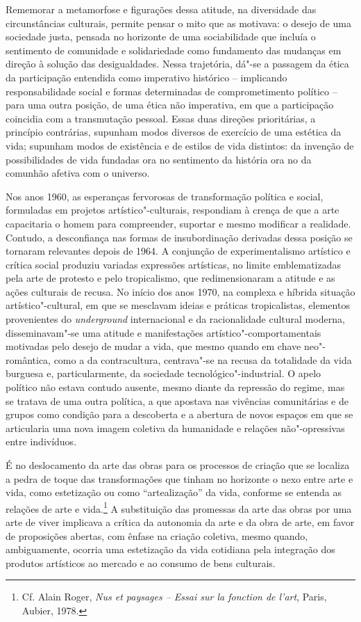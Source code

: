 Rememorar a metamorfose e figurações dessa atitude, na diversidade das
circunstâncias culturais, permite pensar o mito que as motivava: o
desejo de uma sociedade justa, pensada no horizonte de uma sociabilidade
que incluía o sentimento de comunidade e solidariedade como fundamento
das mudanças em direção à solução das desigualdades. Nessa trajetória,
dá"-se a passagem da ética da participação entendida como imperativo
histórico -- implicando responsabilidade social e formas determinadas de
comprometimento político -- para uma outra posição, de uma ética não
imperativa, em que a participação coincidia com a transmutação pessoal.
Essas duas direções prioritárias, a princípio contrárias, supunham modos
diversos de exercício de uma estética da vida; supunham modos de
existência e de estilos de vida distintos: da invenção de possibilidades
de vida fundadas ora no sentimento da história ora no da comunhão
afetiva com o universo.

Nos anos 1960, as esperanças fervorosas de transformação política e
social, formuladas em projetos artístico"-culturais, respondiam à crença
de que a arte capacitaria o homem para compreender, suportar e mesmo
modificar a realidade. Contudo, a desconfiança nas formas de
insubordinação derivadas dessa posição se tornaram relevantes depois de
1964. A conjunção de experimentalismo artístico e crítica social
produziu variadas expressões artísticas, no limite emblematizadas pela
arte de protesto e pelo tropicalismo, que redimensionaram a atitude e as
ações culturais de recusa. No início dos anos 1970, na complexa e
híbrida situação artístico"-cultural, em que se mesclavam ideias e
práticas tropicalistas, elementos provenientes do \emph{underground}
internacional e da racionalidade cultural moderna, disseminavam"-se uma
atitude e manifestações artístico"-comportamentais motivadas pelo desejo
de mudar a vida, que mesmo quando em chave neo"-romântica, como a da
contracultura, centrava"-se na recusa da totalidade da vida burguesa e,
particularmente, da sociedade tecnológico"-industrial. O apelo político
não estava contudo ausente, mesmo diante da repressão do regime, mas se
tratava de uma outra política, a que apostava nas vivências comunitárias
e de grupos como condição para a descoberta e a abertura de novos
espaços em que se articularia uma nova imagem coletiva da humanidade e
relações não"-opressivas entre indivíduos.

É no deslocamento da arte das obras para os processos de criação que se
localiza a pedra de toque das transformações que tinham no horizonte o
nexo entre arte e vida, como estetização ou como ``artealização'' da
vida, conforme se entenda as relações de arte e vida.\footnote{Cf. Alain Roger, \emph{Nus et paysages -- Essai sur la fonction de l'art}, Paris, Aubier, 1978.}
A substituição das promessas da arte das obras por uma arte de viver
implicava a crítica da autonomia da arte e da obra de arte, em favor de
proposições abertas, com ênfase na criação coletiva, mesmo quando,
ambiguamente, ocorria uma estetização da vida cotidiana pela integração
dos produtos artísticos ao mercado e ao consumo de bens culturais.

